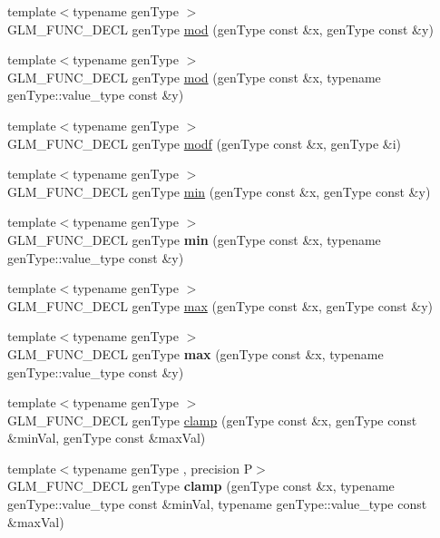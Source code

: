 \begin{DoxyCompactItemize}
{\footnotesize template$<$typename gen\+Type $>$ }\\G\+L\+M\+\_\+\+F\+U\+N\+C\+\_\+\+D\+E\+CL gen\+Type \hyperlink{group__core__func__common_ga8cc8a75b05125fe1c30de43102ef42e1}{mod} (gen\+Type const \&x, gen\+Type const \&y)
\item 
{\footnotesize template$<$typename gen\+Type $>$ }\\G\+L\+M\+\_\+\+F\+U\+N\+C\+\_\+\+D\+E\+CL gen\+Type \hyperlink{group__core__func__common_gad2127c78cb9e89ab462892b11417ded3}{mod} (gen\+Type const \&x, typename gen\+Type\+::value\+\_\+type const \&y)
\item 
{\footnotesize template$<$typename gen\+Type $>$ }\\G\+L\+M\+\_\+\+F\+U\+N\+C\+\_\+\+D\+E\+CL gen\+Type \hyperlink{group__core__func__common_gae47da02eb07d660201c09a0df7298a05}{modf} (gen\+Type const \&x, gen\+Type \&i)
\item 
{\footnotesize template$<$typename gen\+Type $>$ }\\G\+L\+M\+\_\+\+F\+U\+N\+C\+\_\+\+D\+E\+CL gen\+Type \hyperlink{group__core__func__common_ga3dc90dbd66c9ca1dd5625c93d9c50f02}{min} (gen\+Type const \&x, gen\+Type const \&y)
\item 
{\footnotesize template$<$typename gen\+Type $>$ }\\G\+L\+M\+\_\+\+F\+U\+N\+C\+\_\+\+D\+E\+CL gen\+Type {\bfseries min} (gen\+Type const \&x, typename gen\+Type\+::value\+\_\+type const \&y)
\item 
{\footnotesize template$<$typename gen\+Type $>$ }\\G\+L\+M\+\_\+\+F\+U\+N\+C\+\_\+\+D\+E\+CL gen\+Type \hyperlink{group__core__func__common_gaa228561a9da55898f8f72ad2403fafac}{max} (gen\+Type const \&x, gen\+Type const \&y)
\item 
{\footnotesize template$<$typename gen\+Type $>$ }\\G\+L\+M\+\_\+\+F\+U\+N\+C\+\_\+\+D\+E\+CL gen\+Type {\bfseries max} (gen\+Type const \&x, typename gen\+Type\+::value\+\_\+type const \&y)
\item 
{\footnotesize template$<$typename gen\+Type $>$ }\\G\+L\+M\+\_\+\+F\+U\+N\+C\+\_\+\+D\+E\+CL gen\+Type \hyperlink{group__core__func__common_ga72e9e213c84f06a329a2a838b51200f4}{clamp} (gen\+Type const \&x, gen\+Type const \&min\+Val, gen\+Type const \&max\+Val)
\item 
{\footnotesize template$<$typename gen\+Type , precision P$>$ }\\G\+L\+M\+\_\+\+F\+U\+N\+C\+\_\+\+D\+E\+CL gen\+Type {\bfseries clamp} (gen\+Type const \&x, typename gen\+Type\+::value\+\_\+type const \&min\+Val, typename gen\+Type\+::value\+\_\+type const \&max\+Val)

\end{DoxyCompactItemize}
